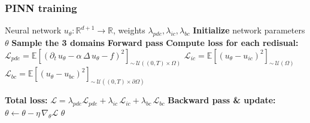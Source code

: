 \documentclass{beamer}
\begin{document}
\begin{frame}
\frametitle{PINN training}

\begin{algorithm}[H]
\caption{PINN Training}
\begin{algorithmic}[1]
    \Require Neural network $u_\theta: \mathbb{R}^{d+1}\to\mathbb{R}$, weights $\lambda_{pde}, \lambda_{ic}, \lambda_{bc}$
    \State \textbf{Initialize} network parameters $\theta$
        \State \textbf{Sample the 3 domains}
        \State \textbf{Forward pass}
        \State \textbf{Compute loss for each redisual:}
               \State $\mathcal{L}_{pde} = \mathbb{E}\left[(\partial_t\,u_{\theta} - \alpha\,\Delta\,u_{\theta} - f)^2\right]_{\sim\:\mathcal{U}((0,T)\times\Omega)}$
               \State $\mathcal{L}_{ic} = \mathbb{E}\left[(u_{\theta} - u_{ic})^2\right]_{\sim\:\mathcal{U}(\Omega)}$
               \State $\mathcal{L}_{bc} = \mathbb{E}\left[(u_{\theta} - u_{bc})^2\right]_{\sim\:\mathcal{U}((0,T)\times\partial\Omega)}$

        \State \textbf{Total loss:}
               $\mathcal{L} = \lambda_{pde}\mathcal{L}_{pde} + \lambda_{ic}\,\mathcal{L}_{ic} + \lambda_{bc}\,\mathcal{L}_{bc}$
        \State \textbf{Backward pass \& update:}
               $\theta \leftarrow \theta - \eta\,\nabla_\theta \mathcal{L}$
    \EndFor
    \State \Return $\theta$
\end{algorithmic}
\end{algorithm}

\end{frame}
\end{document}
